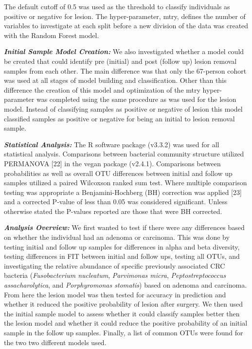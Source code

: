 \documentclass[12pt,]{article}
\begin{document}
The default cutoff of 0.5 was used as the threshold to classify
individuals as positive or negative for lesion. The hyper-parameter,
mtry, defines the number of variables to investigate at each split
before a new division of the data was created with the Random Forest
model.

\textbf{\emph{Initial Sample Model Creation:}} We also investigated
whether a model could be created that could identify pre (initial) and
post (follow up) lesion removal samples from each other. The main
difference was that only the 67-person cohort was used at all stages of
model building and classification. Other than this difference the
creation of this model and optimization of the mtry hyper-parameter was
completed using the same procedure as was used for the lesion model.
Instead of classifying samples as positive or negative of lesion this
model classified samples as positive or negative for being an initial to
lesion removal sample.

\textbf{\emph{Statistical Analysis:}} The R software package (v3.3.2)
was used for all statistical analysis. Comparisons between bacterial
community structure utilized PERMANOVA {[}22{]} in the vegan package
(v2.4.1). Comparisons between probabilities as well as overall OTU
differences between initial and follow up samples utilized a paired
Wilcoxson ranked sum test. Where multiple comparison testing was
appropriate a Benjamini-Hochberg (BH) correction was applied {[}23{]}
and a corrected P-value of less than 0.05 was considered significant.
Unless otherwise stated the P-values reported are those that were BH
corrected.

\textbf{\emph{Analysis Overview:}} We first wanted to test if there were
any differences based on whether the individual had an adenoma or
carcinoma. This was done by testing initial and follow up samples for
differences in alpha and beta diversity, testing differences in FIT
between initial and follow ups, testing all OTUs, and investigating the
relative abundance of specific previously associated CRC bacteria
(\emph{Fusobacterium nucleatum}, \emph{Parvimonas micra},
\emph{Peptostreptococcus assacharolytica}, and \emph{Porphyromonas
stomatis}) based on adenoma and carcinoma. From here the lesion model
was then tested for accuracy in prediction and whether it reduced the
positive probability of lesion after surgery. We then used the initial
sample model to assess whether it could classify samples better then the
lesion model and whether it could reduce the positive probability of an
initial sample in the follow up samples. Finally, a list of common OTUs
were found for the two two different models used.
\end{document}
